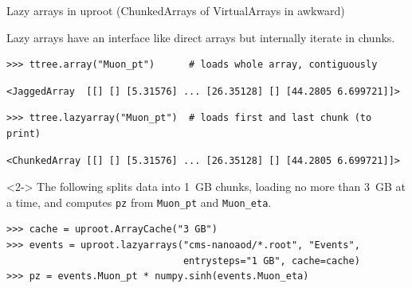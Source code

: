 \documentclass[aspectratio=169]{beamer}
\begin{document}
\begin{frame}[fragile]{Lazy arrays in uproot (ChunkedArrays of VirtualArrays in awkward)}
\large
\vspace{0.25 cm}

Lazy arrays have an interface like direct arrays but internally iterate in chunks.

\small
\begin{verbatim}
>>> ttree.array("Muon_pt")      # loads whole array, contiguously
\end{verbatim}

\vspace{-0.6 cm}
\color{darkblue}\begin{verbatim}
<JaggedArray  [[] [] [5.31576] ... [26.35128] [] [44.2805 6.699721]]>
\end{verbatim}
\color{black}

\vspace{-0.6 cm}
\begin{verbatim}
>>> ttree.lazyarray("Muon_pt")  # loads first and last chunk (to print)
\end{verbatim}

\vspace{-0.6 cm}
\color{darkblue}\begin{verbatim}
<ChunkedArray [[] [] [5.31576] ... [26.35128] [] [44.2805 6.699721]]>
\end{verbatim}
\color{black}\large

\begin{uncoverenv}<2->
The following splits data into 1~GB chunks, loading no more than 3~GB at a time, and computes \texttt{pz} from \texttt{Muon_pt} and \texttt{Muon_eta}.

\small
\begin{verbatim}
>>> cache = uproot.ArrayCache("3 GB")
>>> events = uproot.lazyarrays("cms-nanoaod/*.root", "Events",
                               entrysteps="1 GB", cache=cache)
>>> pz = events.Muon_pt * numpy.sinh(events.Muon_eta)
\end{verbatim}
\end{uncoverenv}
\end{frame}
\end{document}
